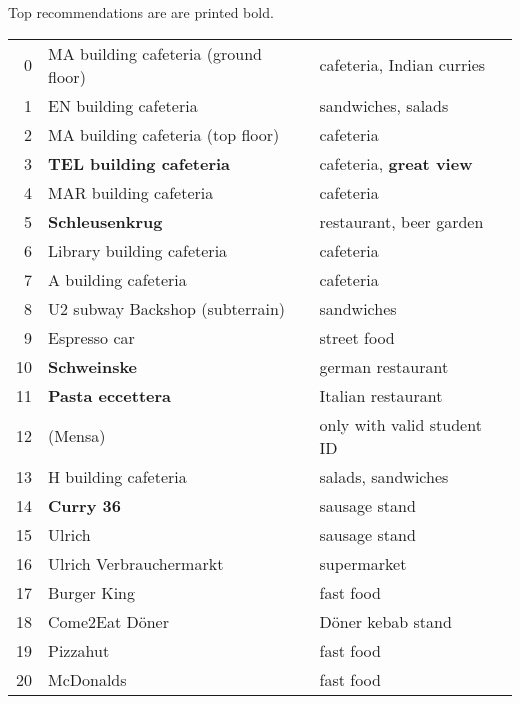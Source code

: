 Top recommendations are are printed bold.
\begingroup
\small
\begin{multicols}{2}[]
    \begin{tabular}{rll}
        0 & MA building cafeteria (ground floor) & cafeteria, Indian curries\\
        1 & EN building cafeteria & sandwiches, salads\\
        2 & MA building cafeteria (top floor) & cafeteria\\
        3 & \bf TEL building cafeteria & cafeteria, \bf great view \\
        4 & MAR building cafeteria & cafeteria \\
        5 & \bf Schleusenkrug & restaurant, beer garden \\ 
        6 & Library building cafeteria & cafeteria\\
        7 & A building cafeteria & cafeteria\\
        8 & U2 subway Backshop (subterrain) & sandwiches\\
        9 & Espresso car & street food\\
        10 & \bf Schweinske & german restaurant\\ 
        11 & \bf  Pasta eccettera & Italian restaurant\\ 
        12 & (Mensa) & only with valid student ID\\
        13 & H building cafeteria & salads, sandwiches\\
        14 & \bf Curry 36 & sausage stand\\
        15 & Ulrich & sausage stand\\
        16 & Ulrich Verbrauchermarkt& supermarket\\
        17 & Burger King& fast food\\
        18 & Come2Eat D\"oner & D\"oner kebab stand\\
        19 & Pizzahut & fast food\\
        20 & McDonalds & fast food\\
    \end{tabular}
    

\end{multicols}
